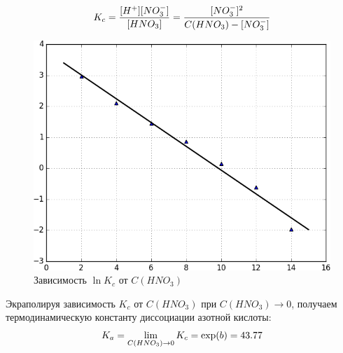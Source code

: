 \documentclass[13pt]{extarticle}
\begin{document}
\begin{gather}
	K_c = \frac{ [H^+][NO_3^-]}{[HNO_3]} = \frac{ [NO_3^-]^2 }{C(HNO_3) - [NO_3^-]} \notag
\end{gather}

\begin{figure}[!ht]
	\centering
	\includegraphics[scale=0.5]{../regr2.png}
	\caption{Зависимость $\ln K_c$ от $C(HNO_3)$}
\end{figure}

Экраполируя зависимость $K_c$ от $C(HNO_3)$ при $C(HNO_3) \rightarrow 0$, получаем термодинамическую константу диссоциации азотной кислоты:
\begin{gather}
	K_a = \lim_{C(HNO_3) \rightarrow 0} K_c = \exp ( b ) = 43.77 \notag
\end{gather} 
\end{document}
